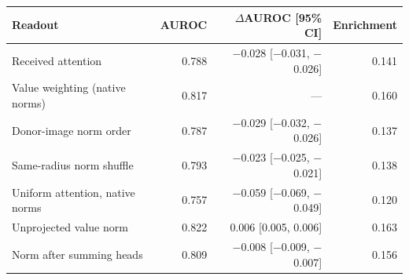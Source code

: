 \begin{tabular}{@{}lrrr@{}}
\toprule
Readout & AUROC & $\Delta$AUROC [95\% CI] & Enrichment \\
\midrule
Received attention & 0.788 & $-$0.028 [$-$0.031, $-$0.026] & 0.141 \\
Value weighting (native norms) & 0.817 & --- & 0.160 \\
Donor-image norm order & 0.787 & $-$0.029 [$-$0.032, $-$0.026] & 0.137 \\
Same-radius norm shuffle & 0.793 & $-$0.023 [$-$0.025, $-$0.021] & 0.138 \\
Uniform attention, native norms & 0.757 & $-$0.059 [$-$0.069, $-$0.049] & 0.120 \\
Unprojected value norm & 0.822 & 0.006 [0.005, 0.006] & 0.163 \\
Norm after summing heads & 0.809 & $-$0.008 [$-$0.009, $-$0.007] & 0.156 \\
\bottomrule
\end{tabular}
